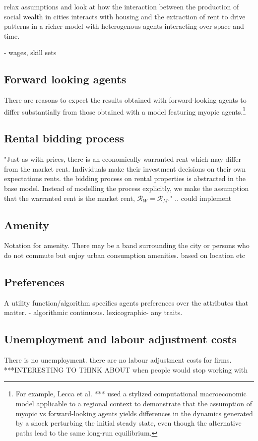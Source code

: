 relax assumptions and look at how the interaction between the production of social wealth in cities interacts with housing and the extraction of rent to drive patterns in a richer model with heterogenous agents interacting over space and time. 

- wages, skill sets

\subsection{Forward looking agents}
There are reasons to expect the results obtained with  forward-looking agents to differ substantially from those obtained with a model featuring myopic agents.\footnote{For example, Lecca et al. *** \cite{LOST-Lecca-et-al-2013}  used a stylized computational macroeconomic model applicable to a regional context to demonstrate that the assumption of myopic vs forward-looking agents yields differences in the dynamics generated by a shock perturbing the initial steady state, even though the alternative paths lead to the same long-run equilibrium.} 

\subsection{Rental bidding process}
 "Just as with prices, there is an economically \gls{warranted rent} which may differ from the \gls{market rent}. Individuals make their investment decisions on their own expectations rents. the bidding process on rental properties is abstracted in the base model. Instead of modelling the process explicitly, we make the assumption that the warranted rent is the market rent, $\mathcal{R}_W = \mathcal{R}_M$." .. could implement

\subsection{Amenity}
Notation for amenity.
There may be a band surrounding the city or persons who do not commute but enjoy urban consumption amenities. 
based on location etc

\subsection{Preferences}
A utility function/algorithm specifies agents preferences over the attributes that matter. - algorithmic continuous. lexicographic- any traits. 

\subsection{Unemployment and labour adjustment costs}
There is no unemployment. there are no labour adjustment costs for firms. ***INTERESTING TO THINK ABOUT  
when people would stop working with

